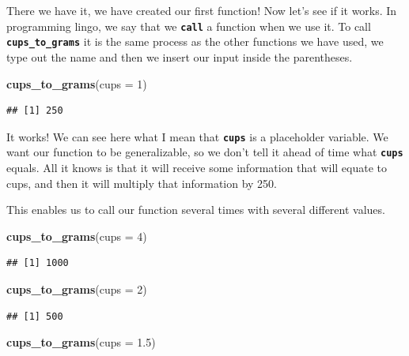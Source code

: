 \documentclass[
]{book}
\newenvironment{Shaded}{\begin{snugshade}}{\end{snugshade}}
\newcommand{\AttributeTok}[1]{\textcolor[rgb]{0.13,0.29,0.53}{#1}}
\newcommand{\DecValTok}[1]{\textcolor[rgb]{0.00,0.00,0.81}{#1}}
\newcommand{\FloatTok}[1]{\textcolor[rgb]{0.00,0.00,0.81}{#1}}
\newcommand{\FunctionTok}[1]{\textcolor[rgb]{0.13,0.29,0.53}{\textbf{#1}}}
\newcommand{\NormalTok}[1]{#1}
\begin{document}
There we have it, we have created our first function! Now let's see if it works. In programming lingo, we say that we \textbf{\texttt{call}} a function when we use it. To call \textbf{\texttt{cups\_to\_grams}} it is the same process as the other functions we have used, we type out the name and then we insert our input inside the parentheses.

\begin{Shaded}
\begin{Highlighting}[]
\FunctionTok{cups\_to\_grams}\NormalTok{(}\AttributeTok{cups =} \DecValTok{1}\NormalTok{)}
\end{Highlighting}
\end{Shaded}

\begin{verbatim}
## [1] 250
\end{verbatim}

It works! We can see here what I mean that \textbf{\texttt{cups}} is a placeholder variable. We want our function to be generalizable, so we don't tell it ahead of time what \textbf{\texttt{cups}} equals. All it knows is that it will receive some information that will equate to cups, and then it will multiply that information by 250.

This enables us to call our function several times with several different values.

\begin{Shaded}
\begin{Highlighting}[]
\FunctionTok{cups\_to\_grams}\NormalTok{(}\AttributeTok{cups =} \DecValTok{4}\NormalTok{)}
\end{Highlighting}
\end{Shaded}

\begin{verbatim}
## [1] 1000
\end{verbatim}

\begin{Shaded}
\begin{Highlighting}[]
\FunctionTok{cups\_to\_grams}\NormalTok{(}\AttributeTok{cups =} \DecValTok{2}\NormalTok{)}
\end{Highlighting}
\end{Shaded}

\begin{verbatim}
## [1] 500
\end{verbatim}

\begin{Shaded}
\begin{Highlighting}[]
\FunctionTok{cups\_to\_grams}\NormalTok{(}\AttributeTok{cups =} \FloatTok{1.5}\NormalTok{)}
\end{Highlighting}
\end{Shaded}
\end{document}
